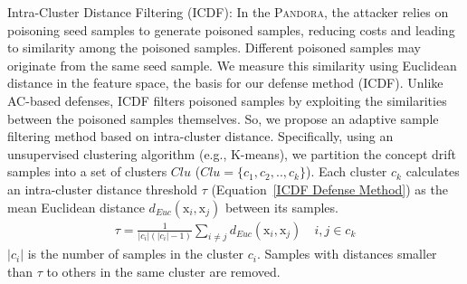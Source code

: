 \documentclass[lettersize,journal]{IEEEtran}
\newcommand{\pandora}{{\scshape Pandora}\xspace}
\begin{document}
Intra-Cluster Distance Filtering (ICDF): In the \pandora, the attacker relies on poisoning seed samples to generate poisoned samples, reducing costs and leading to similarity among the poisoned samples.
Different poisoned samples may originate from the same seed sample.
We measure this similarity using Euclidean distance in the feature space, the basis for our defense method (ICDF).
Unlike AC-based defenses, ICDF filters poisoned samples by exploiting the similarities between the poisoned samples themselves.
So, we propose an adaptive sample filtering method based on intra-cluster distance.
Specifically, using an unsupervised clustering algorithm (e.g., K-means), we partition the concept drift samples into a set of clusters $Clu$ ($Clu= \{c_{1},c_{2},..,c_{k} \}$).
Each cluster $c_{k}$ calculates an intra-cluster distance threshold $\tau$ (Equation~\ref{ICDF Defense Method}) as the mean Euclidean distance $d_{Euc}(\bm{\mathrm{x}}_{i}, \bm{\mathrm{x}}_{j})$ between its samples.
\begin{equation}
	\begin{aligned}
		\tau = \frac{1}{|c_{i}| (|c_{i}| - 1)} \sum_{i \neq j} d_{Euc}(\bm{\mathrm{x}}_{i}, \bm{\mathrm{x}}_{j}) \quad i,j \in c_{k}
	\end{aligned}
	\label{ICDF Defense Method}
\end{equation}
$|c_{i}|$ is the number of samples in the cluster $c_{i}$.
Samples with distances smaller than $\tau$ to others in the same cluster are removed.
\end{document}
